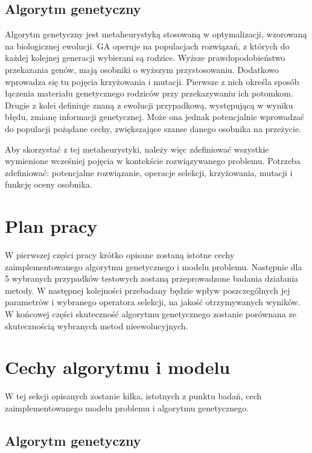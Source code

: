 \documentclass{article}
\begin{document}
	\subsection{Algorytm genetyczny}
	Algorytm genetyczny jest metaheurystyką stosowaną w optymalizacji, wzorowaną na biologicznej ewolucji. GA operuje na populacjach rozwiązań, z których do każdej kolejnej generacji wybierani są rodzice. Wyższe prawdopodobieństwo przekazania genów, mają osobniki o wyższym przystosowaniu. Dodatkowo wprowadza się tu pojęcia krzyżowania i mutacji. Pierwsze z nich określa sposób łączenia materiału genetycznego rodziców przy przekazywaniu ich potomkom. Drugie z kolei definiuje znaną z ewolucji przypadkową, występującą w wyniku błędu, zmianę informacji genetycznej.
	Może ona jednak potencjalnie wprowadzać do populacji pożądane cechy, zwiększające szanse danego osobnika na przeżycie. \par Aby skorzystać z tej metaheurystyki, należy więc zdefiniować wszystkie wymienione wcześniej pojęcia w kontekście rozwiązywanego problemu. Potrzeba zdefiniować: potencjalne rozwiązanie, operacje selekcji, krzyżowania, mutacji i funkcję oceny osobnika.
	
	\section{Plan pracy}
	W pierwszej części pracy krótko opisane zostaną istotne cechy zaimplementowanego algorytmu genetycznego i modelu problemu. Następnie dla 5 wybranych przypadków testowych zostaną przeprowadzone badania działania metody. W następnej kolejności przebadany będzie wpływ poszczególnych jej parametrów i wybranego operatora selekcji, na jakość otrzymywanych wyników. W końcowej części skuteczność algorytmu genetycznego zostanie porównana ze skutecznością wybranych metod nieewolucyjnych.
	
	\section{Cechy algorytmu i modelu}
	W tej sekcji opisanych zostanie kilka, istotnych z punktu badań, cech zaimplementowanego modelu problemu i algorytmu genetycznego.
	
	\subsection{Algorytm genetyczny}
\end{document}
